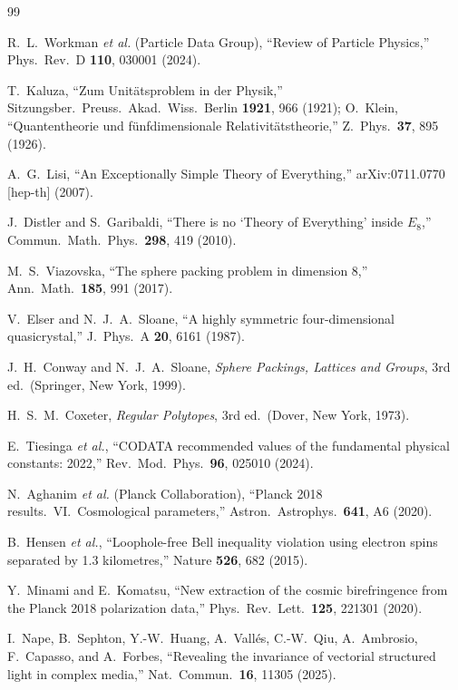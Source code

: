 \documentclass[aps,prd,twocolumn,superscriptaddress,nofootinbib,showpacs]{revtex4-2}
\begin{document}
\begin{thebibliography}{99}

R.~L.~Workman \textit{et al.} (Particle Data Group),
``Review of Particle Physics,''
Phys.\ Rev.\ D \textbf{110}, 030001 (2024).

T.~Kaluza, ``Zum Unit\"atsproblem in der Physik,''
Sitzungsber.\ Preuss.\ Akad.\ Wiss.\ Berlin \textbf{1921}, 966 (1921);
O.~Klein, ``Quantentheorie und f\"unfdimensionale Relativit\"atstheorie,''
Z.\ Phys.\ \textbf{37}, 895 (1926).

A.~G.~Lisi, ``An Exceptionally Simple Theory of Everything,''
arXiv:0711.0770 [hep-th] (2007).

J.~Distler and S.~Garibaldi,
``There is no `Theory of Everything' inside $E_8$,''
Commun.\ Math.\ Phys.\ \textbf{298}, 419 (2010).

M.~S.~Viazovska,
``The sphere packing problem in dimension 8,''
Ann.\ Math.\ \textbf{185}, 991 (2017).

V.~Elser and N.~J.~A.~Sloane,
``A highly symmetric four-dimensional quasicrystal,''
J.\ Phys.\ A \textbf{20}, 6161 (1987).

J.~H.~Conway and N.~J.~A.~Sloane,
\textit{Sphere Packings, Lattices and Groups},
3rd ed.\ (Springer, New York, 1999).

H.~S.~M.~Coxeter,
\textit{Regular Polytopes},
3rd ed.\ (Dover, New York, 1973).

E.~Tiesinga \textit{et al.},
``CODATA recommended values of the fundamental physical constants: 2022,''
Rev.\ Mod.\ Phys.\ \textbf{96}, 025010 (2024).

N.~Aghanim \textit{et al.} (Planck Collaboration),
``Planck 2018 results.\ VI.\ Cosmological parameters,''
Astron.\ Astrophys.\ \textbf{641}, A6 (2020).

B.~Hensen \textit{et al.},
``Loophole-free Bell inequality violation using electron spins
separated by 1.3 kilometres,''
Nature \textbf{526}, 682 (2015).

Y.~Minami and E.~Komatsu,
``New extraction of the cosmic birefringence from the Planck 2018
polarization data,''
Phys.\ Rev.\ Lett.\ \textbf{125}, 221301 (2020).

I.~Nape, B.~Sephton, Y.-W.~Huang, A.~Vallés, C.-W.~Qiu,
A.~Ambrosio, F.~Capasso, and A.~Forbes,
``Revealing the invariance of vectorial structured light in
complex media,''
Nat.\ Commun.\ \textbf{16}, 11305 (2025).


\end{thebibliography}
\end{document}
